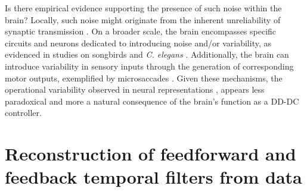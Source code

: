 \documentclass[9pt,twocolumn,twoside]{pnas-new}
\begin{document}
Is there empirical evidence supporting the presence of such noise within the brain? Locally, such noise might originate from the inherent unreliability of synaptic transmission \citep{dobrunz1997heterogeneity}. On a broader scale, the brain encompasses specific circuits and neurons dedicated to introducing noise and/or variability, as evidenced in studies on songbirds \citep{olveczky2005vocal} and {\it C. elegans} \citep{gordus2015feedback}. Additionally, the brain can introduce variability in sensory inputs through the generation of corresponding motor outputs, exemplified by microsaccades \citep{ko2010microsaccades}. Given these mechanisms, the operational variability observed in neural representations \citep{deitch2021representational, schoonover2021representational}, appears less paradoxical and more a natural consequence of the brain's function as a DD-DC controller.

\section*{Reconstruction of feedforward and feedback temporal filters from data}
\end{document}
